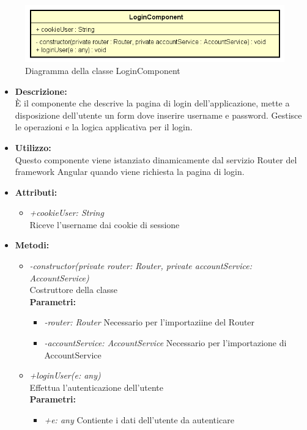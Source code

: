 \begin{figure}[h!]
	\centering
	\includegraphics[scale=0.8]{res/sections/SpecificaFrontEnd/Components/Disegnetti/login.png}
	\caption{Diagramma della classe LoginComponent}
\end{figure}

\begin{itemize}
	\item \textbf{Descrizione:}\\
	È il componente che descrive la pagina di login dell’applicazione, mette a disposizione dell’utente un form dove inserire username e password. Gestisce le operazioni e la logica applicativa per il login.
	\item \textbf{Utilizzo:}\\
	Questo componente viene istanziato dinamicamente dal servizio Router del framework Angular quando viene richiesta la pagina di login.
	\item \textbf{Attributi:}
		\begin{itemize}
			\item \emph{+cookieUser: String}\\
			Riceve l'username dai cookie di sessione
		\end{itemize}
	\item \textbf{Metodi:}
		\begin{itemize}
			\item \emph{-constructor(private router: Router, private accountService: AccountService)}\\
    		Costruttore della classe\\
    		\textbf{Parametri:}
    		\begin{itemize}
    			\item \emph{-router: Router}
    			Necessario per l'importaziine del Router
    			\item \emph{-accountService: AccountService}
    			Necessario per l'importazione di AccountService
    		\end{itemize}
    		\item \emph{+loginUser(e: any)}\\
    		Effettua l'autenticazione dell'utente\\
    		\textbf{Parametri:}
    		\begin{itemize}
    			\item \emph{+e: any}
    			Contiente i dati dell'utente da autenticare
    		\end{itemize}
		\end{itemize}
\end{itemize}